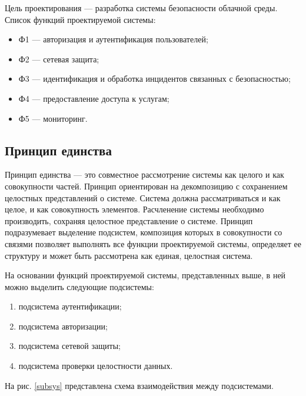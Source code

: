 Цель проектирования --- разработка системы безопасности облачной среды.
Список функций проектируемой системы:
\begin{itemize}
  \item Ф1 --- авторизация и аутентификация пользователей;
  \item Ф2 --- сетевая защита;
  \item Ф3 --- идентификация и обработка инцидентов связанных с безопасностью;
  \item Ф4 --- предоставление доступа к услугам;
  \item Ф5 --- мониторинг.
\end{itemize}

\subsection{Принцип единства}

Принцип единства --- это совместное рассмотрение системы как целого и как совокупности частей.
Принцип ориентирован на декомпозицию с сохранением целостных представлений о системе.
Система должна рассматриваться и как целое, и как совокупность элементов.
Расчленение системы необходимо производить, сохраняя целостное представление о системе.
Принцип подразумевает выделение подсистем, композиция которых в совокупности со связями позволяет выполнять все функции проектируемой системы, определяет ее структуру и может быть рассмотрена как единая, целостная система.

На основании функций проектируемой системы, представленных выше, в ней можно выделить следующие подсистемы:
\begin{enumerate}
  \item подсистема аутентификации;
  \item подсистема авторизации;
  \item подсистема сетевой защиты;
  \item подсистема проверки целостности данных.
\end{enumerate}

На рис. \ref{subsys} представлена схема взаимодействия между подсистемами.

